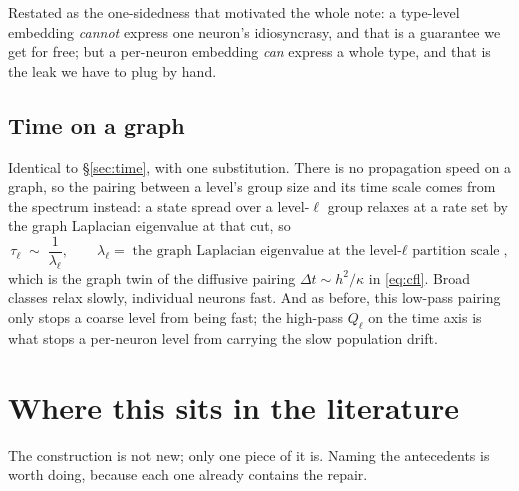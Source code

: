 \documentclass[11pt,a4paper]{article}
\begin{document}
Restated as the one-sidedness that motivated the whole note: a type-level embedding
\emph{cannot} express one neuron's idiosyncrasy, and that is a guarantee we get for free;
but a per-neuron embedding \emph{can} express a whole type, and that is the leak we have to
plug by hand.

\subsection{Time on a graph}

Identical to \S\ref{sec:time}, with one substitution. There is no propagation speed on a
graph, so the pairing between a level's group size and its time scale comes from the
spectrum instead: a state spread over a level-$\ell$ group relaxes at a rate set by the
graph Laplacian eigenvalue at that cut, so
\begin{equation}
\tau_\ell \;\sim\; \frac{1}{\lambda_\ell} ,
\qquad
\lambda_\ell = \text{the graph Laplacian eigenvalue at the level-$\ell$ partition scale} ,
\label{eq:gtau}
\end{equation}
which is the graph twin of the diffusive pairing $\Delta t \sim h^2/\kappa$ in
\eqref{eq:cfl}. Broad classes relax slowly, individual neurons fast. And as before, this
low-pass pairing only stops a coarse level from being fast; the high-pass $Q_\ell$ on the
time axis is what stops a per-neuron level from carrying the slow population drift.

\section{Where this sits in the literature}
\label{sec:lit}

The construction is not new; only one piece of it is. Naming the antecedents is worth doing,
because each one already contains the repair.
\end{document}
